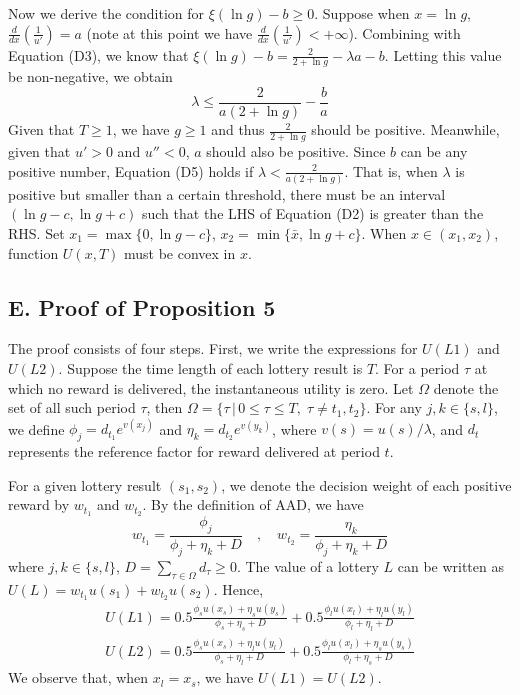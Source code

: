 Now we derive the condition for \(\xi(\ln g)-b\geq 0\). Suppose when
\(x=\ln g\), \(\frac{d}{dx}\left(\frac{1}{u'}\right)=a\) (note at this
point we have \(\frac{d}{dx}\left(\frac{1}{u'}\right)<+\infty\)).
Combining with Equation (D3), we know that
\(\xi(\ln g)-b =\frac{2}{2+\ln g}-\lambda a-b\). Letting this value be
non-negative, we obtain\[\tag{D5}
\lambda \leq \frac{2}{a(2+\ln g)}-\frac{b}{a}
\]Given that \(T\geq1\), we have \(g\geq 1\) and thus
\(\frac{2}{2+\ln g}\) should be positive. Meanwhile, given that \(u'>0\)
and \(u''<0\), \(a\) should also be positive. Since \(b\) can be any
positive number, Equation (D5) holds if
\(\lambda <\frac{2}{a(2+\ln g)}\). That is, when \(\lambda\) is positive
but smaller than a certain threshold, there must be an interval
\((\ln g-c,\ln g+c)\) such that the LHS of Equation (D2) is greater than
the RHS. Set \(x_1 = \max\{0,\ln g-c\}\),
\(x_2=\min\{\bar{x}, \ln g +c\}\). When \(x\in (x_1,x_2)\), function
\(U(x,T)\) must be convex in \(x\).

\hypertarget{e.-proof-of-proposition-5}{%
\subsection*{E. Proof of Proposition
5}\label{e.-proof-of-proposition-5}}

The proof consists of four steps. First, we write the expressions for
\(U(L1)\) and \(U(L2)\). Suppose the time length of each lottery result
is \(T\). For a period \(\tau\) at which no reward is delivered, the
instantaneous utility is zero. Let \(\Omega\) denote the set of all such
period \(\tau\), then
\(\Omega=\{\tau\,|\,0\leq\tau\leq T,\;\tau \neq t_1,t_2\}\). For any
\(j,k\in\{s,l\}\), we define \(\phi_j=d_{t_1}e^{v(x_j)}\) and
\(\eta_k=d_{t_2}e^{v(y_k)}\), where \(v(s)=u(s)/\lambda\), and \(d_t\)
represents the reference factor for reward delivered at period \(t\).

For a given lottery result \((s_1,s_2)\), we denote the decision weight
of each positive reward by \(w_{t_1}\) and \(w_{t_2}\). By the
definition of AAD, we have\[
w_{t_1} = \frac{\phi_j}{\phi_j + \eta_k +D} \quad ,\quad
w_{t_2} = \frac{\eta_k}{\phi_j + \eta_k +D}
\]where \(j,k\in\{s,l\}\), \(D=\sum_{\tau\in\Omega} d_{\tau}\geq 0\).
The value of a lottery \(L\) can be written as
\(U(L)=w_{t_1}u(s_1)+w_{t_2}u(s_2)\). Hence, \[\tag{E1}
\begin{aligned}
U(L1)=0.5\frac{\phi_s u(x_s)+\eta_s u(y_s)}{\phi_s+\eta_s+D} + 0.5\frac{\phi_l u(x_l)+\eta_l u(y_l)}{\phi_l+\eta_l+D} \\
U(L2)=0.5\frac{\phi_s u(x_s)+\eta_l u(y_l)}{\phi_s+\eta_l+D} + 0.5\frac{\phi_l u(x_l)+\eta_s u(y_s)}{\phi_l+\eta_s+D}
\end{aligned}
\]We observe that, when \(x_l=x_s\), we have \(U(L1)=U(L2)\).

